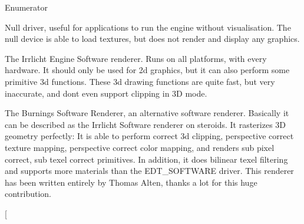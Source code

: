 \begin{Desc}
\item[Enumerator]\par
\begin{description}
\item[{\em 
E\+D\+T\+\_\+\+N\+U\+LL\hypertarget{namespaceirr_1_1video_ae35a6de6d436c76107ad157fe42356d0acfdbd476cbfd4d05e72f9adffcc42210}{}\label{namespaceirr_1_1video_ae35a6de6d436c76107ad157fe42356d0acfdbd476cbfd4d05e72f9adffcc42210}
}]Null driver, useful for applications to run the engine without visualisation. The null device is able to load textures, but does not render and display any graphics. \item[{\em 
E\+D\+T\+\_\+\+S\+O\+F\+T\+W\+A\+RE\hypertarget{namespaceirr_1_1video_ae35a6de6d436c76107ad157fe42356d0a1598cd235a1a6bd052e2011b559e8995}{}\label{namespaceirr_1_1video_ae35a6de6d436c76107ad157fe42356d0a1598cd235a1a6bd052e2011b559e8995}
}]The Irrlicht Engine Software renderer. Runs on all platforms, with every hardware. It should only be used for 2d graphics, but it can also perform some primitive 3d functions. These 3d drawing functions are quite fast, but very inaccurate, and don\textquotesingle{}t even support clipping in 3D mode. \item[{\em 
E\+D\+T\+\_\+\+B\+U\+R\+N\+I\+N\+G\+S\+V\+I\+D\+EO\hypertarget{namespaceirr_1_1video_ae35a6de6d436c76107ad157fe42356d0ae85481da26159b967191ccc6de1e4a05}{}\label{namespaceirr_1_1video_ae35a6de6d436c76107ad157fe42356d0ae85481da26159b967191ccc6de1e4a05}
}]The Burning\textquotesingle{}s Software Renderer, an alternative software renderer. Basically it can be described as the Irrlicht Software renderer on steroids. It rasterizes 3D geometry perfectly\+: It is able to perform correct 3d clipping, perspective correct texture mapping, perspective correct color mapping, and renders sub pixel correct, sub texel correct primitives. In addition, it does bilinear texel filtering and supports more materials than the E\+D\+T\+\_\+\+S\+O\+F\+T\+W\+A\+RE driver. This renderer has been written entirely by Thomas Alten, thanks a lot for this huge contribution. \item[{\em 
}
\end{description}
\end{Desc}
